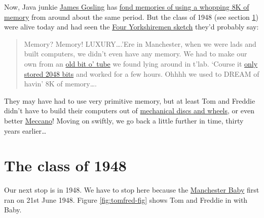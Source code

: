 \documentclass[
  12pt,
]{book}
\begin{document}
Now, Java junkie \href{https://en.wikipedia.org/wiki/James_Gosling}{James Gosling} has \href{http://web.archive.org/web/20041010131526/http://today.java.net/jag/page6.html\#51}{fond memories of using a whopping 8K of memory} from around about the same period. \citep{gosling} But the class of 1948 (see section \ref{y1948}) were alive today and had seen the \href{https://en.wikipedia.org/wiki/Four_Yorkshiremen_sketch}{Four Yorkshiremen sketch} they'd probably say:

\begin{quote}
Memory? Memory! LUXURY\ldots.'Ere in Manchester, when we were lads and built computers, we didn't even
have any memory. We had to make our own from an \href{https://en.wikipedia.org/wiki/Williams_tube}{old bit o' tube} we found lying around in t'lab.
`Course it \href{http://curation.cs.manchester.ac.uk/computer50/www.computer50.org/mark1/ip-mm1.crt2048.html}{only stored 2048 bits} and worked for a few hours. Ohhhh we used to DREAM of havin' 8K of
memory\ldots.
\end{quote}

They may have had to use very primitive memory, but at least Tom and Freddie didn't have to build their computers out of \href{https://www.sciencemuseum.org.uk/objects-and-stories/lovelace-turing-and-invention-computers}{mechanical discs and wheels}, or even better \href{https://en.wikipedia.org/wiki/Differential_analyser\#Use_of_Meccano}{Meccano}! Moving on swiftly, we go back a little further in time, thirty years earlier\ldots{}

\hypertarget{y1948}{%
\section{The class of 1948}\label{y1948}}

Our next stop is in 1948. We have to stop here because the \href{https://en.wikipedia.org/wiki/Manchester_Baby}{Manchester Baby} first ran on 21st June 1948. Figure \ref{fig:tomfred-fig} shows Tom and Freddie in with Baby. \citep{lavington}
\end{document}
